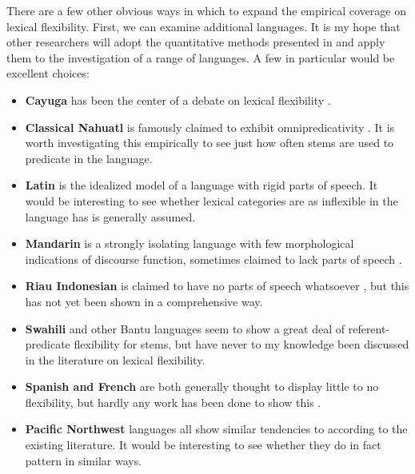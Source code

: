 There are a few other obvious ways in which to expand the empirical coverage on lexical flexibility. First, we can examine additional languages. It is my hope that other researchers will adopt the quantitative methods presented in  and apply them to the investigation of a range of languages. A few in particular would be excellent choices:

\begin{itemize}

  \singlespacing

  \item \textbf{Cayuga} has been the center of a debate on lexical flexibility \parencites{Sasse1988}{Sasse1993}{Mithun2000}.

  \item \textbf{Classical Nahuatl} is famously claimed to exhibit omnipredicativity \parencites{Launey1994}{Launey2004}. It is worth investigating this empirically to see just how often stems are used to predicate in the language.

  \item \textbf{Latin} is the idealized model of a language with rigid parts of speech. It would be interesting to see whether lexical categories are as inflexible in the language has is generally assumed.

  \item \textbf{Mandarin} is a strongly isolating language with few morphological indications of discourse function, sometimes claimed to lack parts of speech \parencites{McDonald2013}{Sun2020}.

  \item \textbf{Riau Indonesian} is claimed to have no parts of speech whatsoever \parencite{Gil1994}, but this has not yet been shown in a comprehensive way.

  \item \textbf{Swahili} and other Bantu languages seem to show a great deal of referent-predicate flexibility for stems, but have never to my knowledge been discussed in the literature on lexical flexibility.

  \item \textbf{Spanish and French} are both generally thought to display little to no flexibility, but hardly any work has been done to show this .

  \item \textbf{Pacific Northwest} languages all show similar tendencies to  according to the existing literature. It would be interesting to see whether they do in fact pattern in similar ways.

\end{itemize}

